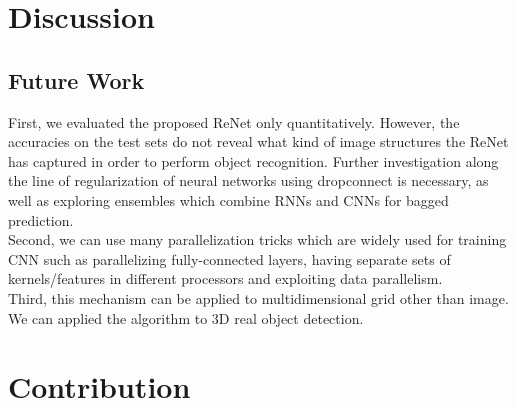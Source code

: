 \documentclass[final,leqno]{siamltex}
\begin{document}
\section{Discussion} \label{discussion}
\subsection{Future Work}
First, we evaluated the proposed ReNet only quantitatively. However, the accuracies on the test sets do not reveal what kind of image structures the ReNet has captured in order to perform object recognition. Further investigation along the line of regularization of neural networks using dropconnect is necessary, as well as exploring ensembles which combine RNNs and CNNs for bagged prediction.\\

Second, we can use many parallelization tricks which are widely used for training CNN such as parallelizing fully-connected layers, having separate sets of kernels/features in different processors and exploiting data parallelism.\\

Third, this mechanism can be applied to multidimensional grid other than image. We can applied the algorithm to 3D real object detection.
\section*{Contribution}



\end{document}
